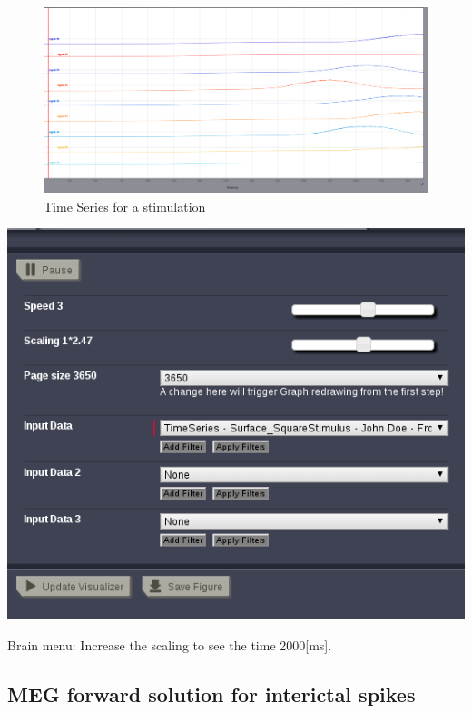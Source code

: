 \documentclass{tufte-handout}
\begin{document}
\begin{figure}[h]
  \includegraphics[width=\linewidth]{Handout_UI_ModellingAnEpilepticPatient_StimulationTimeSeries}%
  \caption{Time Series for a stimulation}%
  \label{fig:stim_ts}%
\end{figure}

\begin{marginfigure}
  \includegraphics[width=\linewidth]{Handout_UI_ModellingAnEpilepticPatient_BrainMenuStimulation}%
  \caption{Brain menu: Increase the scaling to see the time \unit{2000}[ms].}%
  \label{fig:bm_stim}%
\end{marginfigure}

\subsection{MEG forward solution for interictal spikes}
\end{document}
